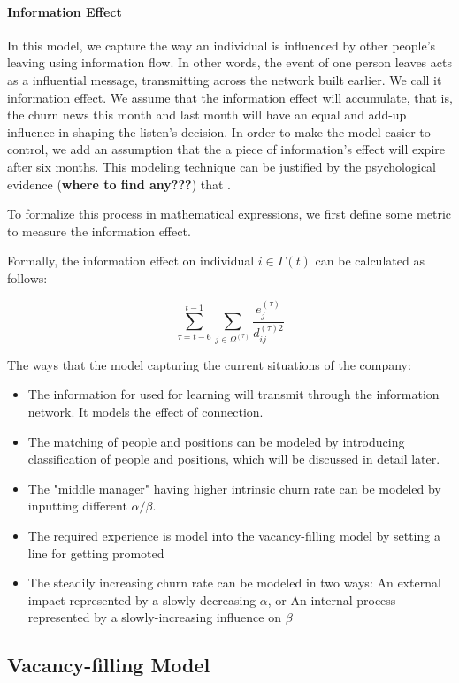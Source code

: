 \documentclass[tcn = 37075, sheet = true, abstract = true]{mcmthesis}
\begin{document}
\paragraph{Information Effect}
In this model, we capture the way an individual is influenced by other people's leaving using information flow. In other words, the event of one person leaves acts as a influential message, transmitting across the network built earlier. We call it information effect. We assume that the information effect will accumulate, that is, the churn news this month and last month will have an equal and add-up influence in shaping the listen's decision. In order to make the model easier to control, we add an assumption that the a piece of information's effect will expire after six months. This modeling technique can be justified by the psychological evidence (\textbf{where to find any???}) that . 

To formalize this process in mathematical expressions, we first define some metric to measure the information effect. 



Formally, the information effect on individual $i\in \Gamma{(t)}$ can be calculated as follows:

$$\displaystyle \sum_{\tau=t-6}^{t-1}\sum_{j\in \Omega^{(\tau)}}\frac{e_j^{(\tau)}}{d_{ij}^{(\tau)2}}$$

The ways that the model capturing the current situations of the company:
\begin{itemize}
\item The information for used for learning will transmit through the information network. It models the effect of connection.
\item The matching of people and positions can be modeled by introducing classification of people and positions, which will be discussed in detail later.
\item The "middle manager" having higher intrinsic churn rate can be modeled by inputting different $\alpha/ \beta$.
\item The required experience is model into the vacancy-filling model by setting a line for getting promoted
\item The steadily increasing churn rate can be modeled in two ways: An external impact represented by a slowly-decreasing $\alpha$, or An internal process represented by a slowly-increasing influence on $\beta$
\end{itemize}




\subsection{Vacancy-filling Model}
\end{document}
